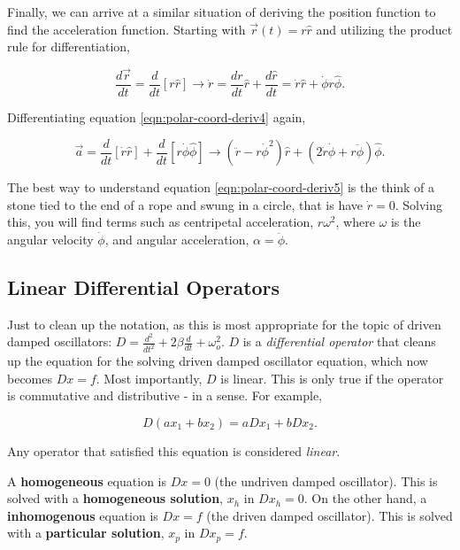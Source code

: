 \documentclass{article}
\begin{document}
Finally, we can arrive at a similar situation of deriving the position function to find the acceleration function. Starting with $\vec{r}(t) = r \hat{r}$ and utilizing the product rule for differentiation,

\begin{equation}
    \label{eqn:polar-coord-deriv4}
    \frac{d\vec{r}}{dt} = \frac{d}{dt}[r \hat r] \rightarrow \dot r = \frac{dr}{dt} \hat r + \frac{d \hat r}{dt} = \dot r \hat r + \dot \phi r \hat \phi.
\end{equation}

\noindent Differentiating equation \ref{eqn:polar-coord-deriv4} again,

\begin{equation}
    \label{eqn:polar-coord-deriv5}
    \vec{a} = \frac{d}{dt}[\dot r \hat r] + \frac{d}{dt}[r \dot \phi \hat \phi] \rightarrow (\ddot r - r \dot \phi^2) \hat r + (2\dot r \dot \phi + r \ddot \phi) \hat \phi.
\end{equation}

The best way to understand equation \ref{eqn:polar-coord-deriv5} is the think of a stone tied to the end of a rope and swung in a circle, that is have $\dot r = 0$. Solving this, you will find terms such as centripetal acceleration, $r \omega^2$, where $\omega$ is the angular velocity $\dot \phi$, and angular acceleration, $\alpha = \ddot \phi$.


\subsection{Linear Differential Operators}

Just to clean up the notation, as this is most appropriate for the topic of driven damped oscillators: $D = \frac{d^2}{dt^2} + 2\beta \frac{d}{dt} + \omega_o^2$. $D$ is  a {\itshape differential operator} that cleans up the equation for the solving driven damped oscillator equation, which now becomes $Dx = f$. Most importantly, $D$ is linear. This is only true if the operator is commutative and distributive - in a sense. For example,

\begin{equation*}
    D(ax_1 + bx_2) = aDx_1 + bDx_2.
\end{equation*}

\noindent Any operator that satisfied this equation is considered {\itshape linear}.

A {\bfseries homogeneous} equation is $Dx=0$ (the undriven damped oscillator). This is solved with a {\bfseries homogeneous solution}, $x_h$ in $Dx_h=0$. On the other hand, a {\bfseries inhomogenous} equation is $Dx=f$ (the driven damped oscillator). This is solved with a {\bfseries particular solution}, $x_p$ in $Dx_p=f$.
\end{document}
